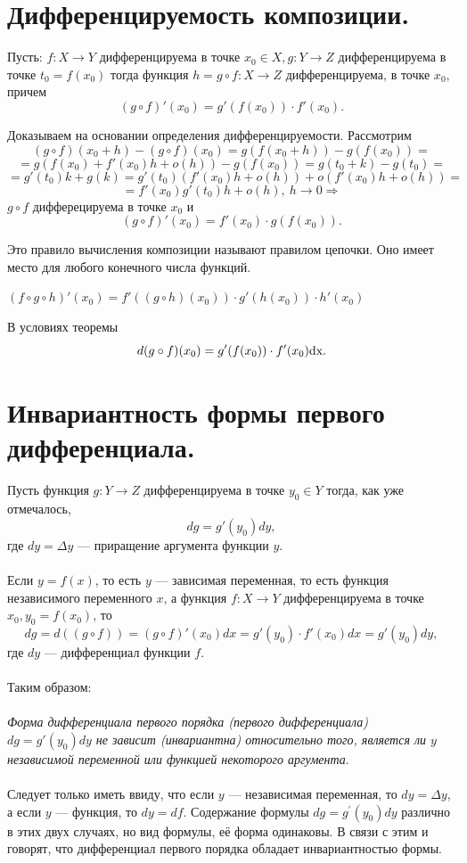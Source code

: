 \section{Дифференцируемость композиции.}
\begin{theorem}
	Пусть: $f:X\to Y$ дифференцируема в точке $x_0\in X, g:Y\to Z$ дифференцируема в точке $t_0=f(x_0)$ тогда функция $h=g\circ f : X\to Z$ дифференцируема, в точке $x_0$, причем$$(g\circ f)'(x_0)=g'(f(x_0))\cdot f'(x_0).$$ 
\end{theorem}
\begin{Proof}
	Доказываем на основании определения дифференцируемости. Рассмотрим $$(g\circ f)(x_0+h)-(g\circ f)(x_0)=g(f(x_0+h))-g(f(x_0))=$$ 
	$$=g(f(x_0)+f'(x_0)h+o(h))-g(f(x_0))=g(t_0+k)-g(t_0)=$$
	$$=g'(t_0)k+g(k)=g'(t_0)(f'(x_0)h+o(h))+o(f'(x_0)h+o(h))=$$
	$$=f'(x_0)g'(t_0)h+o(h),\ h\to 0 \Rightarrow$$
	$g\circ f$ дифферецируема в точке $x_0$ и $$(g\circ f)'(x_0)=f'(x_0)\cdot g(f(x_0)).$$
\end{Proof}
\begin{corollary}
	Это правило вычисления композиции называют правилом цепочки. Оно имеет место для любого конечного числа функций.
\end{corollary}
\begin{example}
	$(f\circ g \circ h)'(x_0)=f'((g\circ h)(x_0))\cdot g'(h(x_0))\cdot h'(x_0)$
\end{example}
\begin{corollary}
	В условиях теоремы $$d(g\circ f)(x_0)=g'(f(x_0))\cdot f'(x_0)\text{dx}.$$
\end{corollary}
\section{Инвариантность формы первого дифференциала.}
Пусть функция $g: Y\to Z$ дифференцируема в точке $y_0\in Y$ тогда, как уже отмечалось, $$d g=g'(y_0)d y,$$ где $d y=\Delta y$ --- приращение аргумента функции $y$.\\\\
Если $y=f(x)$, то есть $y$ --- зависимая переменная, то есть функция независимого переменного $x$, а функция $f: X\to Y$ дифференцируема в точке $x_0, y_0=f(x_0)$, то $$d g=d((g\circ f))=(g\circ f)'(x_0)d x=g'(y_0)\cdot f'(x_0)d x=g'(y_0)d y,$$ где $d y$ --- дифференциал функции $f$.\\\\ Таким образом:\\\\
\textit{Форма дифференциала первого порядка (первого дифференциала) $d g=g'(y_0)d y$ не зависит (инвариантна) относительно того, является ли $y$ независимой переменной или функцией некоторого аргумента}. \\\\
Следует только иметь ввиду, что если $y$ --- независимая переменная, то $dy = \Delta{y}$, а если $y$ --- функция, то $dy = df$. Содержание формулы $dg = g^\prime{(y_0)}dy$ различно в этих двух случаях, но вид формулы, её форма одинаковы. В связи с этим и говорят, что дифференциал первого порядка обладает инвариантностью формы.
